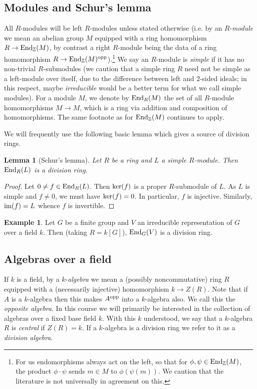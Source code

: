 \documentclass[11pt]{amsart}
\numberwithin{equation}{section}
\newtheorem{lemma}[equation]{Lemma}
\theoremstyle{remark}
\theoremstyle{remark}
\theoremstyle{remark}
\theoremstyle{definition}
\newtheorem{example}[equation]{Example}
\theoremstyle{definition}
\theoremstyle{definition}
\theoremstyle{definition}
\theoremstyle{definition}
\theoremstyle{definition}
\begin{document}
\subsection{Modules and Schur's lemma}
All $R$-modules will be left $R$-modules unless stated otherwise (i.e. by an $R$-\textit{module} we mean an abelian group $M$ equipped with a ring homomorphism $R\rightarrow \textup{End}_\mathbb{Z}(M)$, by contrast a right $R$-module being the data of a ring homomorphism $R\rightarrow \textup{End}_\mathbb{Z}(M)^\textup{opp}$).\footnote{For us endomorphisms always act on the left, so that for $\phi,\psi\in \textup{End}_\mathbb{Z}(M)$, the product $\phi \cdot \psi$ sends $m\in M$ to $\phi (\psi(m))$. We caution that the literature is not universally in agreement on this.} We say an $R$-module is \textit{simple} if it has no non-trivial $R$-submodules (we caution that a simple ring $R$ need not be simple as a left-module over itself, due to the difference between left and $2$-sided ideals; in this respect, maybe \textit{irreducible} would be a better term for what we call simple modules). For a module $M$, we denote by $\textup{End}_R(M)$ the set of all $R$-module homomorphisms $M\rightarrow M$,  which is a ring via addition and composition of homomorphisms. The same footnote as for  $\textup{End}_\mathbb{Z}(M)$ continues to apply.

We will frequently use the following basic lemma which gives a source of division rings. 

\begin{lemma}[Schur's lemma]
Let $R$ be a ring and $L$ a simple $R$-module. Then $\textup{End}_R(L)$ is a division ring.
\end{lemma}

\begin{proof}
Let $0\neq f\in \textup{End}_R(L)$. Then $\textup{ker}(f)$ is a proper $R$-submodule of $L$. As $L$ is simple and $f\neq 0$, we must have $\textup{ker}(f)=0$. In particular, $f$ is injective. Similarly, $\textup{im}(f)=L$ whence $f$ is invertible. 
\end{proof}

\begin{example}
Let $G$ be a finite group and $V$ an irreducible representation of $G$ over a field $k$. Then (taking $R=k[G]$), $\textup{End}_G(V)$ is a division ring.
\end{example}

\subsection{Algebras over a field}
If $k$ is a field, by a $k$-\textit{algebra} we mean a (possibly noncommutative) ring $R$ equipped with a (necessarily injective) homomorphism $k\rightarrow Z(R)$. Note that if $A$ is a $k$-algebra then this makes $A^\textup{opp}$ into a $k$-algebra also. We call this the \textit{opposite algebra}. In this course we will primarily be interested in the collection of algebras over a fixed base field $k$. With this $k$ understood, we say that a $k$-algebra $R$ is \textit{central} if $Z(R)=k$. If a $k$-algebra is a division ring we refer to it as a \textit{division algebra}.
\end{document}
